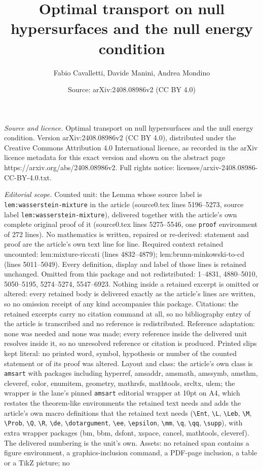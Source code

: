 \documentclass[10pt,a4paper]{amsart}
\title[Optimal transport on null hypersurfaces and the null energy ]{Optimal transport on null hypersurfaces and the null energy condition}
\author{Fabio Cavalletti, Davide Manini, Andrea Mondino}
\date{Source: arXiv:2408.08986v2 (CC BY 4.0)}
\begin{document}
\maketitle

\noindent\emph{Source and licence.} Optimal transport on null hypersurfaces and the null energy condition. Version arXiv:2408.08986v2 (CC BY 4.0), distributed under the Creative Commons Attribution 4.0 International licence, as recorded in the arXiv licence metadata for this exact version and shown on the abstract page https://arxiv.org/abs/2408.08986v2. Full rights notice: licenses/arxiv-2408.08986-CC-BY-4.0.txt.\par\smallskip

\noindent\textit{Editorial scope.} Counted unit: the Lemma whose source label is \texttt{lem:wasserstein-mixture} in the article (source0.tex lines 5196--5273, source label \texttt{lem:wasserstein-mixture}), delivered together with the article's own complete original proof of it (source0.tex lines 5275--5546, one \texttt{proof} environment of 272 lines). No mathematics is written, repaired or re-derived: statement and proof are the article's own text line for line. Required context retained uncounted: lem:mixture-riccati (lines 4832--4879); lem:brunn-minkowski-to-cd (lines 5011--5049). Every definition, display and label of those lines is retained unchanged. Omitted from this package and not redistributed: 1--4831, 4880--5010, 5050--5195, 5274--5274, 5547--6923. Nothing inside a retained excerpt is omitted or altered: every retained body is delivered exactly as the article's lines are written, so no omission receipt of any kind accompanies this package. Citations: the retained excerpts carry no citation command at all, so no bibliography entry of the article is transcribed and no reference is redistributed. Reference adaptation: none was needed and none was made; every reference inside the delivered unit resolves inside it, so no unresolved reference or citation is produced. Printed slips kept literal: no printed word, symbol, hypothesis or number of the counted statement or of its proof was altered. Layout and class: the article's own class is \texttt{amsart} with packages including hyperref, amsaddr, amsmath, amssymb, amsthm, cleveref, color, enumitem, geometry, mathrsfs, mathtools, srcltx, ulem; the wrapper is the lane's pinned \texttt{amsart} editorial wrapper at 10pt on A4, which restates the theorem-like environments the retained text needs and adds the article's own macro definitions that the retained text needs (\texttt{\textbackslash Ent}, \texttt{\textbackslash L}, \texttt{\textbackslash Leb}, \texttt{\textbackslash M}, \texttt{\textbackslash Prob}, \texttt{\textbackslash Q}, \texttt{\textbackslash R}, \texttt{\textbackslash de}, \texttt{\textbackslash dotargument}, \texttt{\textbackslash ee}, \texttt{\textbackslash epsilon}, \texttt{\textbackslash mm}, \texttt{\textbackslash q}, \texttt{\textbackslash qq}, \texttt{\textbackslash supp}), with extra wrapper packages (bm, bbm, dsfont, xspace, cancel, mathtools, cleveref). The delivered numbering is the unit's own. Assets: no retained span contains a figure environment, a graphics-inclusion command, a PDF-page inclusion, a table or a TikZ picture; no 
\end{document}
